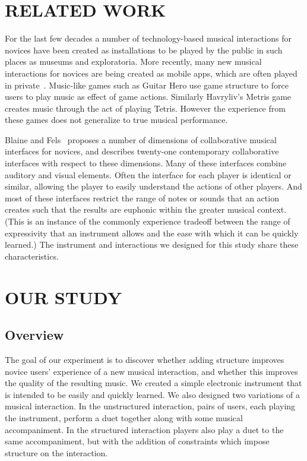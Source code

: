 \documentclass{article}
\begin{document}
\section{RELATED WORK}

For the last few decades a number of technology-based musical interactions for novices have been created as installations to be played by the public in such places as museums and exploratoria.  More recently, many new musical interactions for novices are being created as mobile apps, which are often played in private~\cite{smule,smule-2}. Music-like games such as Guitar Hero use game structure to force users to play music as effect of game actions.  Similarly Havryliv's Metris game~\cite{metris} creates music through the act of playing Tetris.  However the experience from these games does not generalize to true musical performance.

Blaine and Fels~\cite{survey} proposes a number of dimensions of collaborative musical interfaces for novices, and describes twenty-one contemporary collaborative interfaces with respect to these dimensions.  Many of these interfaces combine auditory and visual elements.  Often the interface for each player is identical or similar, allowing the player to easily understand the actions of other players. And most of these interfaces restrict the range of notes or sounds that an action creates such that the results are euphonic within the greater musical context.  (This is an instance of the commonly experience tradeoff between the range of expressivity that an instrument allows and the ease with which it can be quickly learned.)  The instrument and interactions we designed for this study share these characteristics.





\section{OUR STUDY}

\subsection{Overview}

The goal of our experiment is to discover whether adding structure improves novice users' experience of a new musical interaction, and whether this improves the quality of the resulting music.  We created a simple electronic instrument that is intended to be easily and quickly learned.  We also designed two variations of a musical interaction.  In the unstructured interaction, pairs of users, each playing the instrument, perform a duet together along with some musical accompaniment.  In the structured interaction players also play a duet to the same accompaniment, but with the addition of constraints which impose structure on the interaction.
\end{document}
